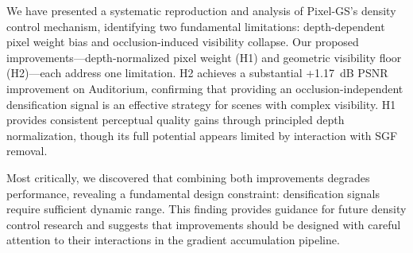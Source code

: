 \documentclass[conference]{IEEEtran}
\begin{document}
We have presented a systematic reproduction and analysis of Pixel-GS's density control mechanism, identifying two fundamental limitations: depth-dependent pixel weight bias and occlusion-induced visibility collapse. Our proposed improvements—depth-normalized pixel weight (H1) and geometric visibility floor (H2)—each address one limitation. H2 achieves a substantial +1.17~dB PSNR improvement on Auditorium, confirming that providing an occlusion-independent densification signal is an effective strategy for scenes with complex visibility. H1 provides consistent perceptual quality gains through principled depth normalization, though its full potential appears limited by interaction with SGF removal.

Most critically, we discovered that combining both improvements degrades performance, revealing a fundamental design constraint: densification signals require sufficient dynamic range. This finding provides guidance for future density control research and suggests that improvements should be designed with careful attention to their interactions in the gradient accumulation pipeline.
\end{document}
